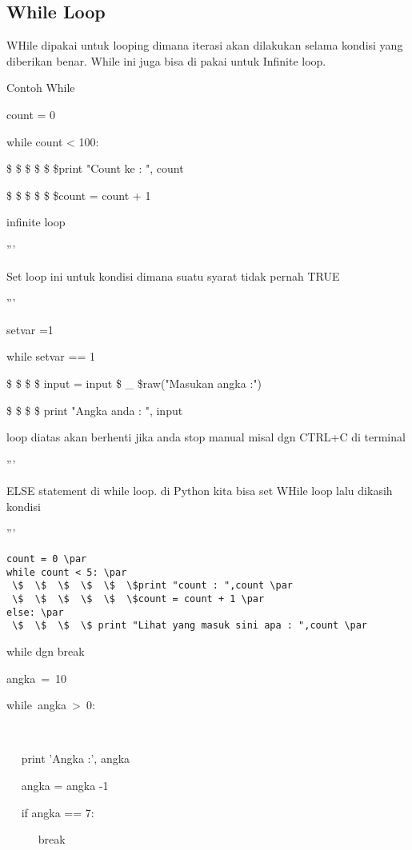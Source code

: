 \subsection{While Loop}
WHile dipakai untuk looping dimana iterasi akan dilakukan selama kondisi yang diberikan benar. While ini juga bisa di pakai untuk Infinite loop. \par
\vspace{12pt}
Contoh While \par
count = 0 \par
while count < 100: \par
 \$  \$  \$  \$  \$  \$print "Count ke : ", count \par
 \$  \$  \$  \$  \$  \$count = count + 1 \par
\vspace{12pt}
infinite loop \par
''' \par
Set loop ini untuk kondisi dimana suatu syarat tidak pernah TRUE \par
''' \par
\vspace{12pt}
setvar =1 \par
while setvar == 1 \par
 \$  \$  \$  \$ input = input \$  \_  \$raw("Masukan angka :") \par
 \$  \$  \$  \$ print "Angka anda : ", input \par
\vspace{12pt}
loop diatas akan berhenti jika anda stop manual misal dgn CTRL+C di terminal \par
''' \par
ELSE statement di while loop. di Python kita bisa set WHile loop lalu dikasih kondisi \par
''' \par
\begin{verbatim}
count = 0 \par
while count < 5: \par
 \$  \$  \$  \$  \$  \$print "count : ",count \par
 \$  \$  \$  \$  \$  \$count = count + 1 \par
else: \par
 \$  \$  \$  \$ print "Lihat yang masuk sini apa : ",count \par
 \end{verbatim}
\vspace{12pt}
while dgn break \par
angka~=~10~~~~~~    \par
while~angka~>~0:~~~~~~~~~~     \par
~~  \par
~~ print 'Angka :', angka \par
~~ angka = angka -1 \par
~~ if angka == 7: \par
~~~~~ break \par
\vspace{\baselineskip}
\vspace{12pt}
\vspace{12pt}
